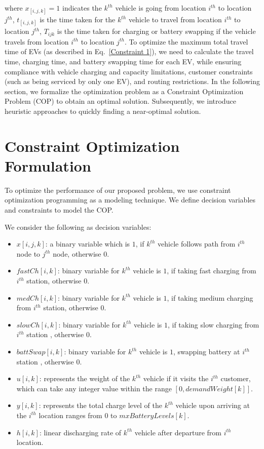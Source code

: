 \documentclass[conference]{IEEEtran}
\begin{document}
    where $x_[i,j,k] = 1$ indicates the $k^{th}$ vehicle is going from location $i^{th}$ to location $j^{th}$,
    $t_[i,j,k]$ is the time taken for the $k^{th}$ vehicle to travel from location $i^{th}$ to location $j^{th}$,
    $T_{ijk}$ is the time taken for charging or battery swapping if the vehicle travels from location $i^{th}$ to location $j^{th}$. To optimize the maximum total travel time of EVs (as described in Eq.~\ref{Constraint 1}), we need to calculate the travel time, charging time, and battery swapping time for each EV, while ensuring compliance with vehicle charging and capacity limitations, customer constraints (such as being serviced by only one EV), and routing restrictions.
 In the following section, we formalize the optimization problem as a Constraint Optimization Problem (COP) to obtain an optimal solution. Subsequently, we introduce heuristic approaches to quickly finding a near-optimal solution.


\section{Constraint Optimization Formulation } \label{sec:COP}
To optimize the performance of our proposed problem, we use constraint optimization programming as a modeling technique. We define decision variables and constraints to model the COP. 
 
We consider the following as decision variables:
\begin{itemize}
    \item $x[i, j, k]$: a binary variable which is $1$, if $k^{th}$ vehicle follows path from  $i^{th}$ node to  $j^{th}$ node, otherwise $0$.
\item  $fastCh[i, k]$: binary variable for $k^{th}$ vehicle is $1$, if taking fast charging from $i^{th}$ station, otherwise $0$.
\item  $medCh[i, k]$:  binary variable for $k^{th}$ vehicle  is $1$, if taking medium charging from  $i^{th}$ station, otherwise $0$. 
\item $slowCh[i, k]$:  binary variable for $k^{th}$ vehicle is $1$, if taking slow charging from $i^{th}$ station , otherwise $0$.
\item  $battSwap[i, k]$: binary variable for $k^{th}$ vehicle  is $1$, swapping battery at $i^{th}$  station , otherwise $0$.
    \item  $u[i, k]$:  represents the weight of the $k^{th}$ vehicle if it visits the $i^{th}$ customer, which can take any integer value within the range $[0, demandWeight[k]]$.
    \item $y[i, k]$:  represents the total charge level of the $k^{th}$ vehicle upon arriving at the $i^{th}$ location ranges from 0 to $mxBatteryLevels[k]$. 
\item $h[i, k]$:  linear discharging rate of $k^{th}$ vehicle after departure from $i^{th}$ location.  
\end{itemize}
\end{document}
